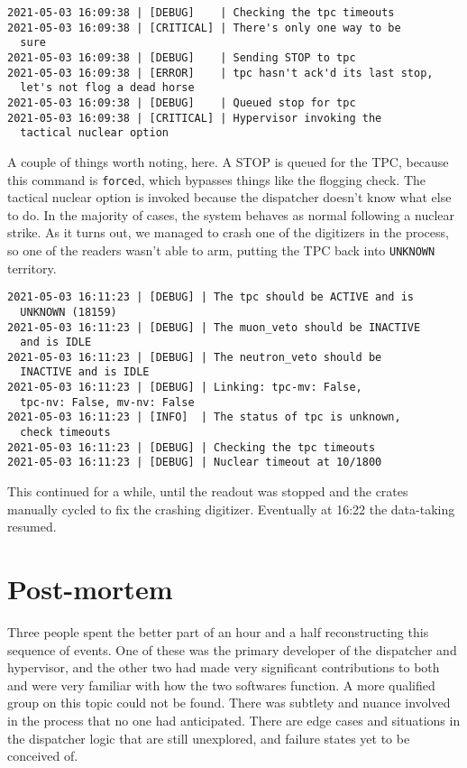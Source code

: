 \begin{verbatim}
2021-05-03 16:09:38 | [DEBUG]    | Checking the tpc timeouts
2021-05-03 16:09:38 | [CRITICAL] | There's only one way to be
  sure
2021-05-03 16:09:38 | [DEBUG]    | Sending STOP to tpc
2021-05-03 16:09:38 | [ERROR]    | tpc hasn't ack'd its last stop,
  let's not flog a dead horse
2021-05-03 16:09:38 | [DEBUG]    | Queued stop for tpc
2021-05-03 16:09:38 | [CRITICAL] | Hypervisor invoking the
  tactical nuclear option
\end{verbatim}
A couple of things worth noting, here.
A STOP is queued for the TPC, because this command is \texttt{force}d, which bypasses things like the flogging check.
The tactical nuclear option is invoked because the dispatcher doesn't know what else to do.
In the majority of cases, the system behaves as normal following a nuclear strike.
As it turns out, we managed to crash one of the digitizers in the process, so one of the readers wasn't able to arm, putting the TPC back into \texttt{UNKNOWN} territory.
\begin{verbatim}
2021-05-03 16:11:23 | [DEBUG] | The tpc should be ACTIVE and is
  UNKNOWN (18159)
2021-05-03 16:11:23 | [DEBUG] | The muon_veto should be INACTIVE
  and is IDLE
2021-05-03 16:11:23 | [DEBUG] | The neutron_veto should be
  INACTIVE and is IDLE
2021-05-03 16:11:23 | [DEBUG] | Linking: tpc-mv: False,
  tpc-nv: False, mv-nv: False
2021-05-03 16:11:23 | [INFO]  | The status of tpc is unknown,
  check timeouts
2021-05-03 16:11:23 | [DEBUG] | Checking the tpc timeouts
2021-05-03 16:11:23 | [DEBUG] | Nuclear timeout at 10/1800
\end{verbatim}
This continued for a while, until the readout was stopped and the crates manually cycled to fix the crashing digitizer. Eventually at 16:22 the data-taking resumed.

\section{Post-mortem}

Three people spent the better part of an hour and a half reconstructing this sequence of events.
One of these was the primary developer of the dispatcher and hypervisor, and the other two had made very significant contributions to both and were very familiar with how the two softwares function.
A more qualified group on this topic could not be found.
There was subtlety and nuance involved in the process that no one had anticipated.
There are edge cases and situations in the dispatcher logic that are still unexplored, and failure states yet to be conceived of.

